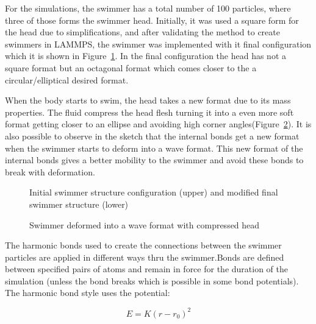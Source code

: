 For the simulations, the swimmer has a total number of 100 particles, where three of those forms the swimmer head. Initially, it was used a square form for the head due to
simplifications, and after validating the method to create swimmers in LAMMPS, the swimmer was implemented with it final configuration which it is shown in Figure~\ref{fig:Bild2.5}.
In the final configuration the head has not a square format but an octagonal format which comes closer to the a circular/elliptical desired format.\par 
When the body starts to swim, the head takes a new format due to its mass properties. The fluid compress the head flesh turning it into a even more soft format getting closer to an 
ellipse and avoiding high corner angles(Figure~\ref{fig:Bild4}). It is also possible to observe in the sketch that the internal bonds get a new format when the swimmer starts to
deform into a wave format. This new format of the internal bonds gives a better mobility to the swimmer and avoid these bonds to break with deformation.  \par

\begin{figure}[ht]
\centering
  \begin{footnotesize}
  
  \caption[Initial swimmer structure configuration (upper) and modified final swimmer structure (lower)]{Initial swimmer structure configuration (upper) and modified final swimmer structure (lower)}
  \label{fig:Bild2.5}
  \end{footnotesize}
\end{figure} 

\begin{figure}[ht]
\centering
  \begin{footnotesize} 
  
  \caption[Swimmer deformed into a wave format with compressed head]{Swimmer deformed into a wave format with compressed head}
  \label{fig:Bild4}
  \end{footnotesize}
\end{figure} 

The harmonic bonds used to create the connections between the swimmer particles are applied in different ways thru the swimmer.Bonds are defined between specified pairs of 
atoms and remain in force for the duration of the simulation (unless the bond breaks which is possible in some bond potentials). The harmonic bond style uses the potential:


\begin{equation} 
  E = K ( r - r_{0})^2
\end{equation}

